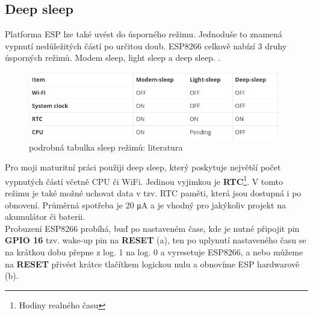 \documentclass[a4paper, 12pt]{report}
\begin{document}
    \subsection{Deep sleep} \label{subsec:deep-sleep}
    Platforma ESP lze také uvést do úsporného režimu.
    Jednoduše to znamená vypnutí nedůležitých částí po určitou doub.
    ESP8266 celkově nabízí 3 druhy úsporných režimů.
    Modem sleep, light sleep a deep sleep. .
    \begin{figure}[h!]
        \centering
        \includegraphics[width=11cm]{images/tabulka_sleep}
        \caption{podrobná tabulka sleep režimů: literatura~\cite{randomnerd}}
        \label{fig:sleep_tabulka}
    \end{figure}
    Pro moji maturitní práci použiji deep sleep, který poskytuje největší počet vypnutých částí včetně CPU či WiFi.
    Jedinou vyjimkou je \textbf{RTC}\footnote{Hodiny realného času}.
    V tomto režimu je také možné uchovat data v tzv. RTC paměti, která jsou dostupná i po obnovení.
    Průměrná spotřeba je 20 \si{\micro A} a je vhodný pro jakýkoliv projekt na akumulátor či baterii. \\
    Probuzení ESP8266 probíhá, buď po nastaveném čase, kde je nutné připojit pin \textbf{GPIO 16} tzv. wake-up pin na \textbf{RESET} (a), ten po uplynutí nastaveného času se na krátkou dobu přepne z log. 1 na log. 0 a vyresetuje ESP8266, a nebo můžeme na \textbf{RESET}  přivést krátce tlačítkem logickou nulu a obnovíme ESP hardwarově (b).
\end{document}
